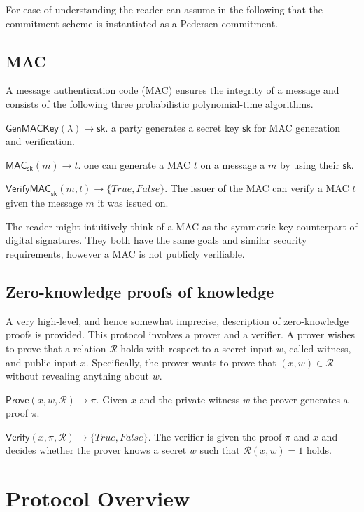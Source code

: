 \documentclass{article}
\begin{document}
For ease of understanding the reader can assume in the following that the commitment scheme is instantiated as a Pedersen commitment.

\subsection{MAC}
A message authentication code (MAC) ensures the integrity of a message and consists of the following three probabilistic polynomial-time algorithms.

\noindent$\mathsf{GenMACKey}(\lambda)\xrightarrow{}{\mathsf{sk}}$. a party generates a secret key $\mathsf{sk}$ for MAC generation and verification.

\noindent$\mathsf{MAC}_{\mathsf{sk}}(m)\xrightarrow{}t$. one can generate a MAC $t$ on a message a $m$ by using their $\mathsf{sk}$.

\noindent$\mathsf{VerifyMAC}_{\mathsf{sk}}(m,t)\xrightarrow{}\{\mathit{True},\mathit{False}\}$. The issuer of the MAC can verify a MAC $t$ given the message $m$ it was issued on.

The reader might intuitively think of a MAC as the symmetric-key counterpart of digital signatures. They both have the same goals and similar security requirements, however a MAC is not publicly verifiable.

\subsection{Zero-knowledge proofs of knowledge}
A very high-level, and hence somewhat imprecise, description of zero-knowledge proofs is provided. This protocol involves a prover and a verifier. A prover wishes to prove that a relation $\mathcal{R}$ holds with respect to a secret input $w$, called witness, and public input $x$. Specifically, the prover wants to prove that $(x, w) \in \mathcal{R}$ without revealing anything about $w$.

\noindent$\mathsf{Prove}(x,w,\mathcal{R})\xrightarrow{}\pi$. Given $x$ and the private witness $w$ the prover generates a proof $\pi$.

\noindent$\mathsf{Verify}(x,\pi,\mathcal{R})\xrightarrow{}\{\mathit{True},\mathit{False}\}$. The verifier is given the proof $\pi$ and $x$ and decides whether the prover knows a secret $w$ such that $\mathcal{R}(x,w)=1$ holds.

\section{Protocol Overview}
\end{document}
